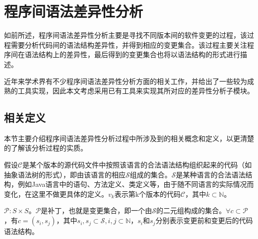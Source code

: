 %
%

\section{程序间语法差异性分析}
\label {chap_diff}

如前所述，程序间语法差异性分析主要是寻找不同版本间的软件变更的过程，该过程需要分析代码间的语法结构差异性，并得到相应的变更集合。该过程主要关注程序间在语法结构上的差异性，最后得到的变更集合也将以语法结构的形式进行描述。


%
近年来学术界有不少程序间语法差异性分析方面的相关工作，并给出了一些较为成熟的工具实现，因此本文考虑采用已有工具来实现其所对应的差异性分析子模块。

\subsection{相关定义}

本节主要介绍程序间语法差异性分析过程中所涉及到的相关概念和定义，以更清楚的了解该分析过程的实质。

假设$\mathcal{C}$是某个版本的源代码文件中按照该语言的合法语法结构组织起来的代码（如抽象语法树的形式），即由该语言的相应$\mathcal{S}$组成的集合。$\mathcal{S}$是某种语言的合法语法结构，例如Java语言中的语句、方法定义、类定义等，由于随不同语言的实际情况而变化，在这里不做更具体的定义。$v_k$表示第k个版本的代码$\mathcal{C}$，其中$k \subset \mathbb{N}$。

\begin{definition}
	$\mathcal{P}: S \times S$。$\mathcal{P}$是补丁，也就是变更集合，即一个由$\mathcal{S}$的二元组构成的集合。$\forall c \subset \mathcal{P}$，有$c = (s_i,s_j)$，其中$s_i,s_j \subset \mathcal{S},i,j \subset \mathbb{N}$，$s_i$和$s_j$分别表示变更前和变更后的代码语法结构。
\end{definition}

